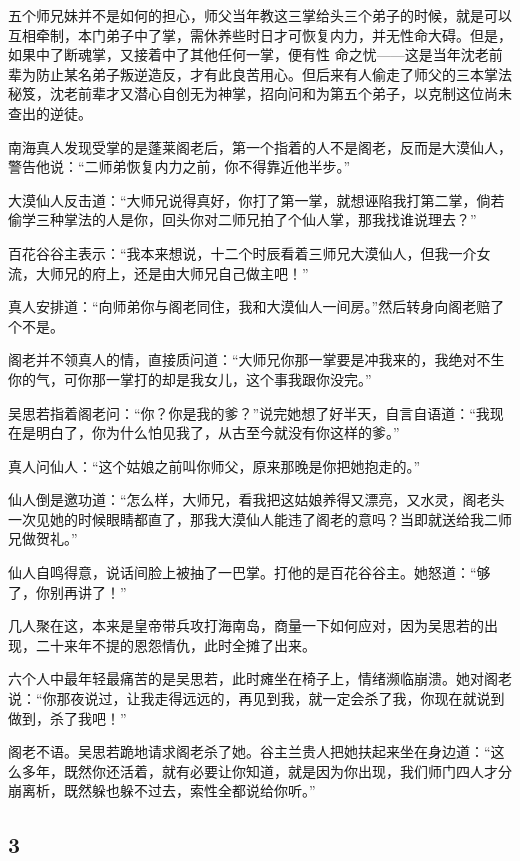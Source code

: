 五个师兄妹并不是如何的担心，师父当年教这三掌给头三个弟子的时候，就是可以互相牵制，本门弟子中了掌，需休养些时日才可恢复内力，并无性命大碍。但是，如果中了断魂掌，又接着中了其他任何一掌，便有性
命之忧——这是当年沈老前辈为防止某名弟子叛逆造反，才有此良苦用心。但后来有人偷走了师父的三本掌法秘笈，沈老前辈才又潜心自创无为神掌，招向问和为第五个弟子，以克制这位尚未查出的逆徒。

南海真人发现受掌的是蓬莱阁老后，第一个指着的人不是阁老，反而是大漠仙人，警告他说：“二师弟恢复内力之前，你不得靠近他半步。”

大漠仙人反击道：“大师兄说得真好，你打了第一掌，就想诬陷我打第二掌，倘若偷学三种掌法的人是你，回头你对二师兄拍了个仙人掌，那我找谁说理去？”

百花谷谷主表示：“我本来想说，十二个时辰看着三师兄大漠仙人，但我一介女流，大师兄的府上，还是由大师兄自己做主吧！”

真人安排道：“向师弟你与阁老同住，我和大漠仙人一间房。”然后转身向阁老赔了个不是。

阁老并不领真人的情，直接质问道：“大师兄你那一掌要是冲我来的，我绝对不生你的气，可你那一掌打的却是我女儿，这个事我跟你没完。”

吴思若指着阁老问：“你？你是我的爹？”说完她想了好半天，自言自语道：“我现在是明白了，你为什么怕见我了，从古至今就没有你这样的爹。”

真人问仙人：“这个姑娘之前叫你师父，原来那晚是你把她抱走的。”

仙人倒是邀功道：“怎么样，大师兄，看我把这姑娘养得又漂亮，又水灵，阁老头一次见她的时候眼睛都直了，那我大漠仙人能违了阁老的意吗？当即就送给我二师兄做贺礼。”

仙人自鸣得意，说话间脸上被抽了一巴掌。打他的是百花谷谷主。她怒道：“够了，你别再讲了！”
\newline

几人聚在这，本来是皇帝带兵攻打海南岛，商量一下如何应对，因为吴思若的出现，二十来年不提的恩怨情仇，此时全摊了出来。

六个人中最年轻最痛苦的是吴思若，此时瘫坐在椅子上，情绪濒临崩溃。她对阁老说：“你那夜说过，让我走得远远的，再见到我，就一定会杀了我，你现在就说到做到，杀了我吧！”

阁老不语。吴思若跪地请求阁老杀了她。谷主兰贵人把她扶起来坐在身边道：“这么多年，既然你还活着，就有必要让你知道，就是因为你出现，我们师门四人才分崩离析，既然躲也躲不过去，索性全都说给你听。”
\newline

{\centering\subsection{3}}

